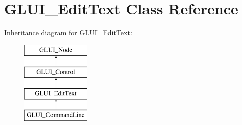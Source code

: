 \hypertarget{classGLUI__EditText}{\section{G\-L\-U\-I\-\_\-\-Edit\-Text Class Reference}
\label{classGLUI__EditText}
}
Inheritance diagram for G\-L\-U\-I\-\_\-\-Edit\-Text\-:\begin{figure}[H]
\begin{center}
\leavevmode
\includegraphics[height=4.000000cm]{classGLUI__EditText}
\end{center}
\end{figure}
